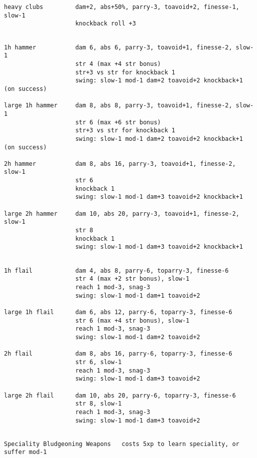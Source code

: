 \begin{verbatim}
heavy clubs         dam+2, abs+50%, parry-3, toavoid+2, finesse-1, slow-1
                    knockback roll +3


\end{verbatim} \pagebreak[1] \begin{verbatim}
1h hammer           dam 6, abs 6, parry-3, toavoid+1, finesse-2, slow-1
                    str 4 (max +4 str bonus)
                    str+3 vs str for knockback 1
                    swing: slow-1 mod-1 dam+2 toavoid+2 knockback+1 (on success)

large 1h hammer     dam 8, abs 8, parry-3, toavoid+1, finesse-2, slow-1
                    str 6 (max +6 str bonus)
                    str+3 vs str for knockback 1
                    swing: slow-1 mod-1 dam+2 toavoid+2 knockback+1 (on success)

2h hammer           dam 8, abs 16, parry-3, toavoid+1, finesse-2, slow-1
                    str 6
                    knockback 1
                    swing: slow-1 mod-1 dam+3 toavoid+2 knockback+1

large 2h hammer     dam 10, abs 20, parry-3, toavoid+1, finesse-2, slow-1
                    str 8
                    knockback 1
                    swing: slow-1 mod-1 dam+3 toavoid+2 knockback+1


\end{verbatim} \pagebreak[1] \begin{verbatim}
1h flail            dam 4, abs 8, parry-6, toparry-3, finesse-6
                    str 4 (max +2 str bonus), slow-1
                    reach 1 mod-3, snag-3
                    swing: slow-1 mod-1 dam+1 toavoid+2

large 1h flail      dam 6, abs 12, parry-6, toparry-3, finesse-6
                    str 6 (max +4 str bonus), slow-1
                    reach 1 mod-3, snag-3
                    swing: slow-1 mod-1 dam+2 toavoid+2

2h flail            dam 8, abs 16, parry-6, toparry-3, finesse-6
                    str 6, slow-1
                    reach 1 mod-3, snag-3
                    swing: slow-1 mod-1 dam+3 toavoid+2

large 2h flail      dam 10, abs 20, parry-6, toparry-3, finesse-6
                    str 8, slow-1
                    reach 1 mod-3, snag-3
                    swing: slow-1 mod-1 dam+3 toavoid+2


\end{verbatim} \pagebreak[1] \begin{verbatim}
Speciality Bludgeoning Weapons   costs 5xp to learn speciality, or suffer mod-1


\end{verbatim}
